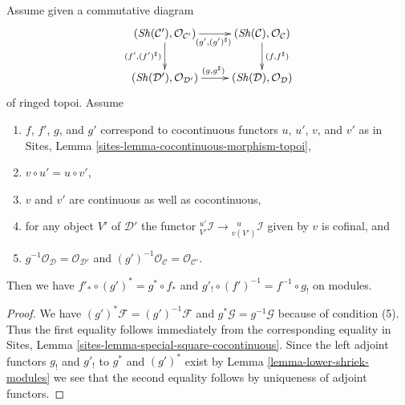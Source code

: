 \begin{lemma}
\label{lemma-special-square-cocontinuous}
Assume given a commutative diagram
$$
\xymatrix{
(\Sh(\mathcal{C}'), \mathcal{O}_{\mathcal{C}'})
\ar[r]_{(g', (g')^\sharp)} \ar[d]_{(f', (f')^\sharp)} &
(\Sh(\mathcal{C}), \mathcal{O}_\mathcal{C}) \ar[d]^{(f, f^\sharp)} \\
(\Sh(\mathcal{D}'), \mathcal{O}_{\mathcal{D}'}) \ar[r]^{(g, g^\sharp)} &
(\Sh(\mathcal{D}), \mathcal{O}_\mathcal{D})
}
$$
of ringed topoi. Assume
\begin{enumerate}
\item $f$, $f'$, $g$, and $g'$ correspond to cocontinuous functors
$u$, $u'$, $v$, and $v'$ as in
Sites, Lemma \ref{sites-lemma-cocontinuous-morphism-topoi},
\item $v \circ u' = u \circ v'$,
\item $v$ and $v'$ are continuous as well as cocontinuous,
\item for any object $V'$ of $\mathcal{D}'$ the functor
${}^{u'}_{V'}\mathcal{I} \to {}^{\ \ \ u}_{v(V')}\mathcal{I}$
given by $v$ is cofinal, and
\item $g^{-1}\mathcal{O}_{\mathcal{D}} = \mathcal{O}_{\mathcal{D}'}$
and $(g')^{-1}\mathcal{O}_{\mathcal{C}} = \mathcal{O}_{\mathcal{C}'}$.
\end{enumerate}
Then we have $f'_* \circ (g')^* = g^* \circ f_*$ and
$g'_! \circ (f')^{-1} = f^{-1} \circ g_!$ on modules.
\end{lemma}

\begin{proof}
We have $(g')^*\mathcal{F} = (g')^{-1}\mathcal{F}$ and
$g^*\mathcal{G} = g^{-1}\mathcal{G}$ because of condition (5).
Thus the first equality follows immediately from the corresponding
equality in Sites, Lemma \ref{sites-lemma-special-square-cocontinuous}.
Since the left adjoint functors $g_!$ and $g'_!$ to $g^*$ and $(g')^*$
exist by Lemma \ref{lemma-lower-shriek-modules}
we see that the second equality follows by
uniqueness of adjoint functors.
\end{proof}

